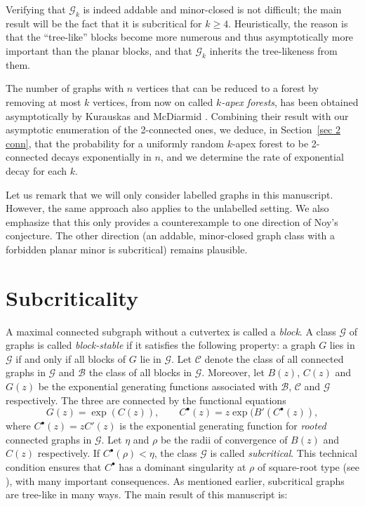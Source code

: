 \documentclass[a4paper]{article}
\newcommand{\G}{\mathcal{G}}
\newcommand{\C}{\mathcal{C}}
\newcommand{\B}{\mathcal{B}}
\theoremstyle{remark}
\begin{document}
Verifying that $\G_k$ is indeed addable and minor-closed is not difficult; the main result will be the fact that it is subcritical for $k \geq 4$. Heuristically, the reason is that the ``tree-like'' blocks become more numerous and thus asymptotically more important than the planar blocks, and that $\G_k$ inherits the tree-likeness from them.

The number of graphs with $n$ vertices that can be reduced to a forest by removing at most $k$ vertices, from now on called {\em $k$-apex forests}, has been obtained asymptotically by Kurauskas and McDiarmid \cite{KurMcDRan}. Combining their result with our asymptotic enumeration of the 2-connected ones, we deduce, in Section~\ref{sec 2 conn}, that the probability for a uniformly random $k$-apex forest to be 2-connected decays exponentially in $n$, and we determine the rate of exponential decay for each $k$.

Let us remark that we will only consider labelled graphs in this manuscript. However, the same approach also applies to the unlabelled setting. We also emphasize that this only provides a counterexample to one direction of Noy's conjecture. The other direction (an addable, minor-closed graph class with a forbidden planar minor is subcritical) remains plausible. 

\section{Subcriticality}
A maximal connected subgraph without a cutvertex is called a \emph{block}.
A class $\G$ of graphs is called \emph{block-stable} if it satisfies the following property: a graph $G$ lies in $\G$ if and only if all blocks of $G$ lie in $\G$. Let $\C$ denote the class of all connected graphs in $\G$ and $\B$ the class of all blocks in $\G$. Moreover, let $B(z)$, $C(z)$ and $G(z)$ be the  exponential generating functions associated with $\B$, $\C$ and $\G$ respectively. The three are connected by the functional equations
\begin{equation}\label{eq:subcritical_funeq}
G(z) = \exp(C(z)),\qquad C^{\bullet}(z) = z \exp(B'(C^{\bullet}(z)),
\end{equation}
where $C^{\bullet}(z) = z C'(z)$ is the exponential generating function for \emph{rooted} connected graphs in $\G$. Let $\eta$ and $\rho$ be the radii of convergence of $B(z)$ and $C(z)$ respectively. If $C^{\bullet}(\rho) < \eta$, the class $\G$ is called \emph{subcritical}. This technical condition ensures that $C^{\bullet}$ has a dominant singularity at $\rho$ of square-root type (see \cite{DFKKR}), with many important consequences. As mentioned earlier, subcritical graphs are tree-like in many ways. The main result of this manuscript is:
\end{document}
